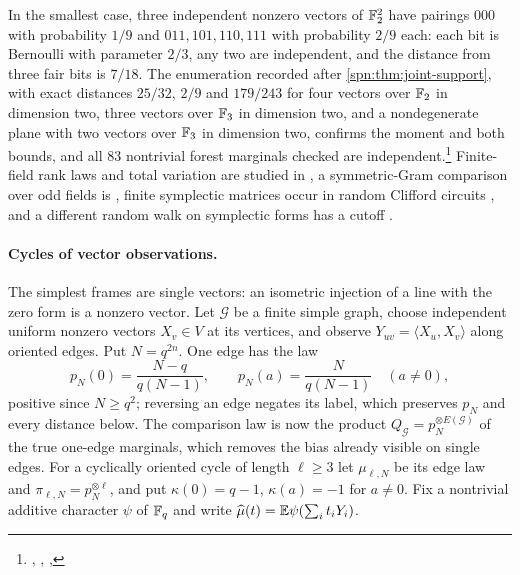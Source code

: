 In the smallest case, three independent nonzero vectors of $\mathbb{F}_2^2$ have pairings $000$ with
probability $1/9$ and $011,101,110,111$ with probability $2/9$ each: each bit is Bernoulli with
parameter $2/3$, any two are independent, and the distance from three fair bits is $7/18$. The
enumeration recorded after \cref{spn:thm:joint-support}, with exact distances
$25/32$, $2/9$ and $179/243$ for four vectors over $\mathbb{F}_2$ in dimension two, three vectors over $\mathbb{F}_3$
in dimension two, and a nondegenerate plane with two vectors over $\mathbb{F}_3$ in dimension two, confirms the moment and both
bounds, and all $83$ nontrivial forest marginals checked are
independent.\footnote{\raggedright{},
,
,
}
Finite-field rank laws and total variation are studied in \cite{Fulman2015Stein}, a symmetric-Gram
comparison over odd fields is \cite[Proposition~5.2]{Li2026Average}, finite symplectic matrices occur
in random Clifford circuits \cite{Farshi2022Mixing}, and a different random walk on symplectic forms
has a cutoff \cite{He2020Random}.

\paragraph{Cycles of vector observations.}
The simplest frames are single vectors: an isometric injection of a line with the zero form is a
nonzero vector. Let $\mathcal G$ be a finite simple graph, choose independent uniform nonzero vectors
$X_v\in V$ at its vertices, and observe $Y_{uv}=\langle X_u,X_v\rangle$ along oriented edges. Put
$N=q^{2n}$. One edge has the law
\[
 p_N(0)=\frac{N-q}{q(N-1)},\qquad p_N(a)=\frac N{q(N-1)}\quad(a\ne0),
\]
positive since $N\ge q^2$; reversing an edge negates its label, which preserves $p_N$ and every
distance below. The comparison law is now the product $Q_{\mathcal G}=p_N^{\otimes E(\mathcal G)}$ of
the true one-edge marginals, which removes the bias already visible on single edges. For a cyclically
oriented cycle of length $\ell\ge3$ let $\mu_{\ell,N}$ be its edge law and
$\pi_{\ell,N}=p_N^{\otimes\ell}$, and put $\kappa(0)=q-1$, $\kappa(a)=-1$ for $a\ne0$. Fix a nontrivial
additive character $\psi$ of $\mathbb{F}_q$ and write $\widehat\mu(t)=\mathbb{E}\psi(\sum_it_iY_i)$.

